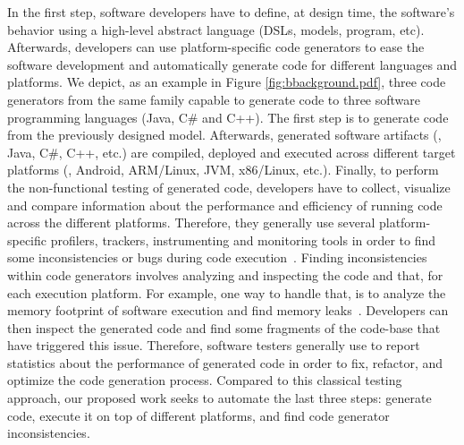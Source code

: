 In the first step, software developers have to define, at design time, the software's behavior using a high-level abstract language (DSLs, models, program, etc). Afterwards, developers can use platform-specific code generators to ease the software development and automatically generate code for different languages and platforms. We depict, as an example in Figure \ref{fig:bbackground.pdf}, three code generators from the same family capable to generate code to three software programming languages (Java, C\# and C++). The first step is to generate code from the previously designed model.
Afterwards, generated software artifacts (\eg, Java, C\#, C++, etc.) are compiled, deployed and executed across different target platforms (\eg, Android, ARM/Linux, JVM, x86/Linux, etc.). 
Finally, to perform the non-functional testing of generated code, developers have to collect, visualize and compare information about the performance and efficiency of running code across the different platforms. 
Therefore, they generally use several platform-specific profilers, trackers, instrumenting and monitoring tools in order to find some inconsistencies or bugs during code execution~\cite{guana2014chaintracker,delgado2004taxonomy}. Finding inconsistencies within code generators involves analyzing and inspecting the code and that, for each execution platform. For example, one way to handle that, is to analyze the memory footprint of software execution and find memory leaks~\cite{nethercote2007valgrind}. Developers can then inspect the generated code and find some fragments of the code-base that have triggered this issue. %
Therefore, software testers generally use to report statistics about the performance of generated code in order to fix, refactor, and optimize the code generation process. Compared to this classical testing approach, our proposed work seeks to automate the last three steps: generate code, execute it on top of different platforms, and find code generator inconsistencies. 


